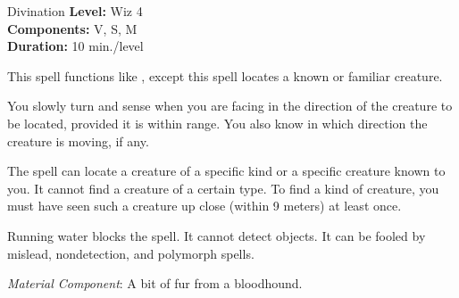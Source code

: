 {Divination}
{
	\textbf{Level:}
	Wiz 4\\
	\textbf{Components:}
	V, S, M\\
	\textbf{Duration:}
	10 min./level\\
}
{
	This spell functions like , except this spell locates a known or familiar creature.

	You slowly turn and sense when you are facing in the direction of the creature to be located, provided it is within range. You also know in which direction the creature is moving, if any.

	The spell can locate a creature of a specific kind or a specific creature known to you. It cannot find a creature of a certain type. To find a kind of creature, you must have seen such a creature up close (within 9 meters) at least once.

	Running water blocks the spell. It cannot detect objects. It can be fooled by mislead, nondetection, and polymorph spells.

	\textit{Material Component}:
	A bit of fur from a bloodhound.

}
